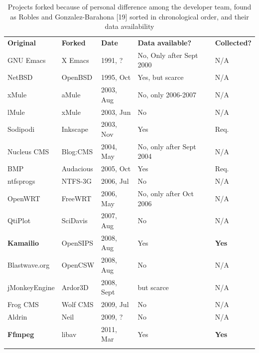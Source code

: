 \documentclass[ifip]{svmult}
\begin{document}
\begin{table}
\centering
\caption{Projects forked because of personal difference among the developer team, found as Robles and Gonzalez-Barahona [19] sorted in chronological order, and their data availability}
\label{tab:3}       %
\begin{tabular}{p{0.92in} p{0.8in} p{0.8in} p{1.7in} p{0.6in}}
\hline\noalign{\smallskip}
\textbf{Original} & \textbf{Forked} & \textbf{Date} & \textbf{Data available?} & \textbf{Collected?}\\
\noalign{\smallskip}\hline\noalign{\smallskip}
GNU Emacs & X Emacs & 1991, ? & No, Only after Sept 2000 & N/A \\ \hline
NetBSD & OpenBSD & 1995, Oct & Yes, but scarce & N/A \\ \hline
xMule & aMule & 2003, Aug & No, only 2006-2007 & N/A \\ \hline
lMule & xMule & 2003, Jun & No & N/A \\ \hline
Sodipodi & Inkscape & 2003, Nov & Yes & Req.\\ \hline
Nucleus CMS & Blog:CMS & 2004, May & No, only after Sept 2004 & N/A \\ \hline
BMP & Audacious & 2005, Oct & Yes & Req. \\ \hline
ntfsprogs & NTFS-3G & 2006, Jul & No & N/A \\ \hline
OpenWRT & FreeWRT & 2006, May & No, only after Oct 2006 & N/A \\ \hline
QtiPlot & SciDavis & 2007, Aug & No & N/A \\ \hline
\textbf{Kamailio} & OpenSIPS & 2008, Aug & Yes & \textbf{Yes} \\ \hline
Blastwave.org & OpenCSW & 2008, Aug & No & N/A \\ \hline
jMonkeyEngine & Ardor3D & 2008, Sept & but scarce & N/A \\ \hline
Frog CMS & Wolf CMS & 2009, Jul & No & N/A \\ \hline
Aldrin & Neil & 2009, ? & No & N/A \\ \hline
\textbf{Ffmpeg} & libav & 2011, Mar & Yes & \textbf{Yes}\\
\noalign{\smallskip}\hline
\end{tabular}
\end{table}
\end{document}
